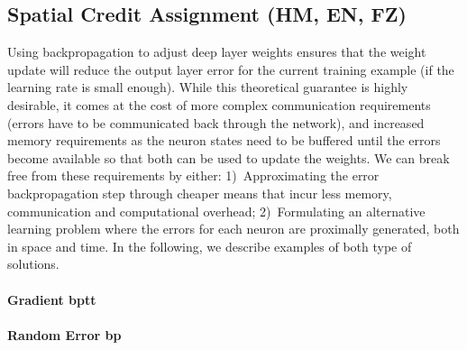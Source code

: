 \documentclass[journal,onecolumn,11pt]{IEEEtran}
\begin{document}
\subsection{Spatial Credit Assignment (HM, EN, FZ)}\label{sec:spatial_CA}
Using backpropagation to adjust deep layer weights ensures that the weight update  will reduce the output layer error for the current training example (if the learning rate is small enough).
While this theoretical guarantee is highly desirable, it comes at the cost of more complex communication requirements (errors have to be communicated back through the network), and increased memory requirements as the neuron states need to be buffered until the errors become available so that both can be used to update the weights.
We can break free from these requirements by either:
1)~Approximating the error backpropagation step through cheaper means that incur less memory, communication and computational overhead;
2)~Formulating an alternative learning problem where the errors for each neuron are proximally generated, both in space and time.
In the following, we describe examples of both type of solutions.

\paragraph{Gradient \Gls{bptt}}

\paragraph{Random Error \Gls{bp}}
\end{document}
